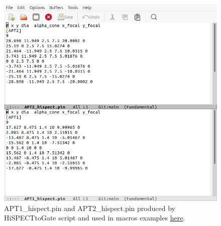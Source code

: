 \documentclass[12pt]{article}
\begin{document}
\begin{figure}[htp]
\centering
\includegraphics[scale=0.45]{figs/pin.png}
\caption{APT1\_hispect.pin and APT2\_hispect.pin produced by HiSPECTtoGate script and used in macros examples \href{https://github.com/kochebina/ParametrisedPinholeCollimator/tree/main/macros}{here}.}
\label{fig:pin}
\end{figure}
 





%
%
\end{document}
